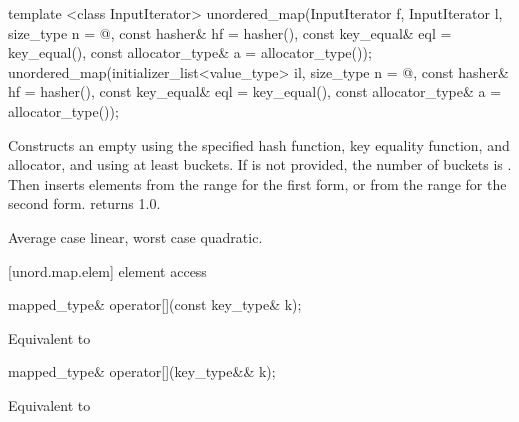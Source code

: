 %
\begin{itemdecl}
template <class InputIterator>
  unordered_map(InputIterator f, InputIterator l,
                size_type n = @\seebelow@,
                const hasher& hf = hasher(),
                const key_equal& eql = key_equal(),
                const allocator_type& a = allocator_type());
unordered_map(initializer_list<value_type> il,
              size_type n = @\seebelow@,
              const hasher& hf = hasher(),
              const key_equal& eql = key_equal(),
              const allocator_type& a = allocator_type());
\end{itemdecl}

\begin{itemdescr}
\pnum
\effects Constructs an empty  using the
specified hash function, key equality function, and allocator, and
using at least  buckets. If  is not
provided, the number of buckets is . Then
inserts elements from the range 
for the first form, or from the range
 for the second form.
 returns 1.0.

\pnum
\complexity Average case linear, worst case quadratic.
\end{itemdescr}

[unord.map.elem]{ element access}

%
%
%
\begin{itemdecl}
mapped_type& operator[](const key_type& k);
\end{itemdecl}

\begin{itemdescr}
\pnum
\effects Equivalent to 
\end{itemdescr}

%
%
%
\begin{itemdecl}
mapped_type& operator[](key_type&& k);
\end{itemdecl}

\begin{itemdescr}
\pnum
\effects Equivalent to 
\end{itemdescr}

